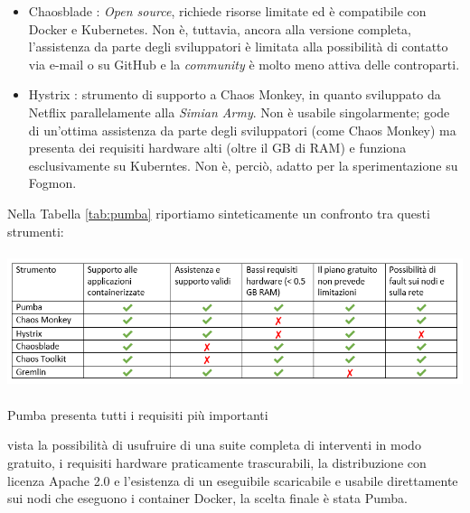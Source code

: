 \begin{itemize}
            \item Chaosblade \cite{blade}: \textit{Open source}, richiede risorse limitate ed è compatibile con Docker e Kubernetes. Non è, tuttavia, ancora alla versione completa, l'assistenza da parte degli sviluppatori è limitata alla possibilità di contatto via e-mail o su GitHub e la \textit{community} è molto meno attiva delle controparti. 
            
            \item Hystrix \cite{hystrix}: strumento di supporto a Chaos Monkey, in quanto sviluppato da Netflix parallelamente alla \textit{Simian Army}. Non è usabile singolarmente; gode di un'ottima assistenza da parte degli sviluppatori (come Chaos Monkey) ma presenta dei requisiti hardware alti (oltre il GB di RAM) e funziona esclusivamente su Kuberntes. Non è, perciò, adatto per la sperimentazione su Fogmon. 
        \end{itemize}
        Nella Tabella \ref{tab:pumba} riportiamo sinteticamente un confronto tra questi strumenti:
        \begin{table}
        \begin{center}
            \includegraphics[width=14cm, height=4cm]{images/tabella.png}
            \caption {Pumba presenta tutti i requisiti più importanti}
            \label {tab:pumba}
        \end{center}
        \end{table}
        vista la possibilità di usufruire di una suite completa di interventi in modo gratuito, i requisiti hardware praticamente trascurabili, la distribuzione con licenza Apache 2.0 \cite{Apache} e l'esistenza di un eseguibile scaricabile e usabile direttamente sui nodi che eseguono i container Docker, la scelta finale è stata Pumba. 
        
